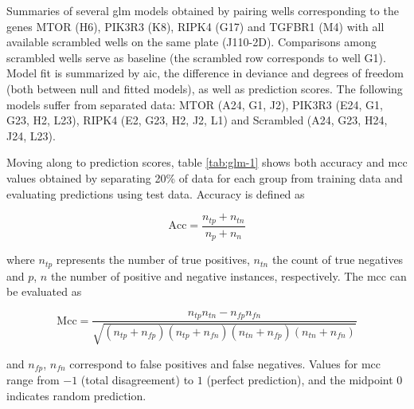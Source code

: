 \renewcommand{\arraystretch}{1.5}
\setlength{\tabcolsep}{0.25em}
\begin{table}
  \centering
  \caption[\Gls{glm} model summaries based on principal components for several well pairings.]{Summaries of several \gls{glm} models obtained by pairing wells corresponding to the genes MTOR (H6), PIK3R3 (K8), RIPK4 (G17) and TGFBR1 (M4) with all available scrambled wells on the same plate (J110-2D). Comparisons among scrambled wells serve as baseline (the scrambled row corresponds to well G1). Model fit is summarized by \gls{aic}, the difference in deviance and degrees of freedom (both between null and fitted models), as well as prediction scores. The following models suffer from separated data: MTOR (A24, G1, J2), PIK3R3 (E24, G1, G23, H2, L23), RIPK4 (E2, G23, H2, J2, L1) and Scrambled (A24, G23, H24, J24, L23).}
  \label{tab:glm-1}
  \footnotesize
  \vspace{5px}
  
\end{table}

Moving along to prediction scores, table \ref{tab:glm-1} shows both accuracy and \gls{mcc} values obtained by separating 20\% of data for each group from training data and evaluating predictions using test data. Accuracy is defined as

\begin{equation}
  \text{Acc} = \frac{n_{tp} + n_{tn}}{n_p+n_n}
\end{equation}

where $n_{tp}$ represents the number of true positives, $n_{tn}$ the count of true negatives and $p$, $n$ the number of positive and negative instances, respectively. The \acrshort{mcc} \citep{Matthews1975} can be evaluated as

\begin{equation}
  \text{Mcc} = \frac{n_{tp} n_{tn} - n_{fp} n_{fn}}{\sqrt{(n_{tp} + n_{fp})(n_{tp} + n_{fn})(n_{tn} + n_{fp})(n_{tn} + n_{fn})}}
\end{equation}

and $n_{fp}$, $n_{fn}$ correspond to false positives and false negatives. Values for \gls{mcc} range from $-1$ (total disagreement) to $1$ (perfect prediction), and the midpoint $0$ indicates random prediction.

